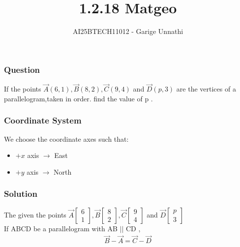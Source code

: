 \documentclass{beamer}
\title{1.2.18 Matgeo}
\author{AI25BTECH11012 - Garige Unnathi}
\date{}
\begin{document}
\frame{\titlepage}

\begin{frame}
\frametitle{Question}
	If the points $\vec{A}(6,1),\vec{B}(8,2),\vec{C}(9,4)$ and $\vec{D}(p,3)$ are the vertices of a parallelogram,taken in order. find the value of p .
\\\end{frame}

\begin{frame}
\frametitle{Coordinate System}
We choose the coordinate axes such that:
\begin{itemize}
    \item $+x$ axis $\to$ East
    \item $+y$ axis $\to$ North
\end{itemize}
\end{frame}

\begin{frame}
\frametitle{Solution}
	The given the points $\vec{A}\begin{bmatrix}6 \\ 1 \end{bmatrix} , \vec{B}\begin{bmatrix}8 \\ 2\end{bmatrix} , \vec{C}\begin{bmatrix}9 \\ 4\end{bmatrix}$ and $\vec{D}\begin{bmatrix}p \\ 3\end{bmatrix}$\\
\vspace{1em}
 If ABCD be a parallelogram with AB $||$ CD ,
\begin{align*}
	\textbf{$\vec{B}-\vec{A} = \vec{C}-\vec{D}$}
\end{align*}
 \end{frame}
\end{document}
